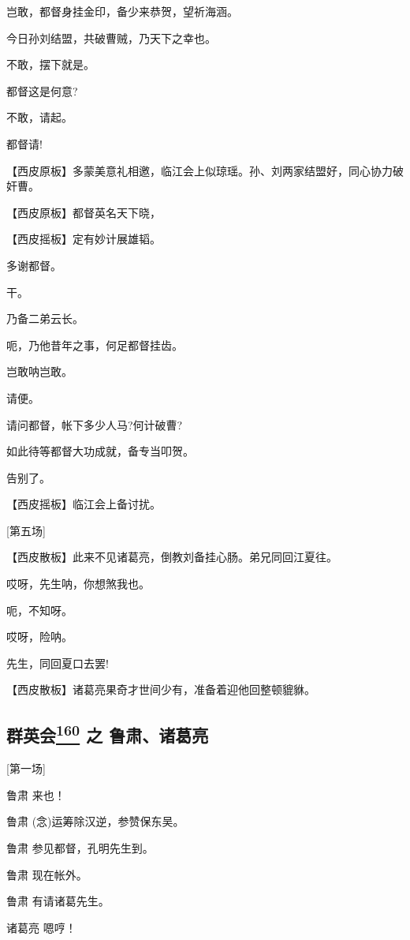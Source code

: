岂敢，都督身挂金印，备少来恭贺，望祈海涵。

今日孙刘结盟，共破曹贼，乃天下之幸也。

不敢，摆下就是。

都督这是何意?

不敢，请起。

都督请!

【西皮原板】多蒙美意礼相邀，临江会上似琼瑶。孙、刘两家结盟好，同心协力破奸曹。

【西皮原板】都督英名天下晓，

【西皮摇板】定有妙计展雄韬。

多谢都督。

干。

乃备二弟云长。

呃，乃他昔年之事，何足都督挂齿。

岂敢呐岂敢。

请便。

请问都督，帐下多少人马?何计破曹?

如此待等都督大功成就，备专当叩贺。

告别了。

【西皮摇板】临江会上备讨扰。

{[}第五场{]}

【西皮散板】此来不见诸葛亮，倒教刘备挂心肠。弟兄同回江夏往。

哎呀，先生呐，你想煞我也。

呃，不知呀。

哎呀，险呐。

先生，同回夏口去罢!

【西皮散板】诸葛亮果奇才世间少有，准备着迎他回整顿貔貅。

\hypertarget{ux7fa4ux82f1ux4f1a-ux4e4b-ux9c81ux8083ux8bf8ux845bux4eae}{%
\subsection{\texorpdfstring{群英会\protect\hyperlink{fn160}{\textsuperscript{160}}
之
鲁肃、诸葛亮}{群英会160 之 鲁肃、诸葛亮}}\label{ux7fa4ux82f1ux4f1a-ux4e4b-ux9c81ux8083ux8bf8ux845bux4eae}}

{[}第一场{]}

鲁肃 来也！

鲁肃 (念)运筹除汉逆，参赞保东吴。

鲁肃 参见都督，孔明先生到。

鲁肃 现在帐外。

鲁肃 有请诸葛先生。

诸葛亮 嗯哼！

